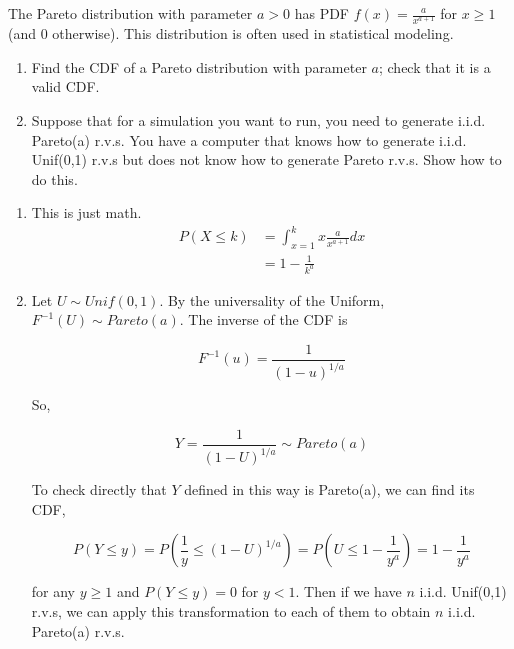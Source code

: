 \documentclass[11pt]{article}
\begin{document}
\begin{exercise}
The Pareto distribution with parameter $a > 0$ has PDF $f(x) = \frac{a}{x^{a+1}}$ for $x \ge 1$ (and 0 otherwise). This distribution is often used in statistical modeling.

\begin{enumerate}
\item Find the CDF of a Pareto distribution with parameter $a$; check that it is a valid CDF.

\item Suppose that for a simulation you want to run, you need to generate i.i.d. Pareto(a) r.v.s. You have a computer that knows how to generate i.i.d. Unif(0,1) r.v.s but does not know how to generate Pareto r.v.s. Show how to do this.
\end{enumerate}
\end{exercise}
\begin{solution}
\begin{enumerate}
\item This is just math.
\begin{align*}
P(X \leq k) &= \int_{x=1}^{k} x \frac{a}{x^{a+1}} dx \\
&= 1 - \frac{1}{k^a}
\end{align*}
\item Let $U \sim Unif(0,1)$. By the universality of the Uniform, $F^{-1}(U) \sim Pareto(a)$. The inverse of the CDF is

$$F^{-1}(u) = \frac{1}{(1-u)^{1/a}}$$

So,

$$Y = \frac{1}{(1-U)^{1/a}} \sim Pareto(a)$$

To check directly that $Y$ defined in this way is Pareto(a), we can find its CDF,

$$P(Y \le y) = P(\frac{1}{y} \le (1-U)^{1/a}) = P(U \le 1 - \frac{1}{y^a}) = 1 - \frac{1}{y^a}$$

for any $y \ge 1$ and $P(Y \le y) = 0$ for $y < 1$. Then if we have $n$ i.i.d. Unif(0,1) r.v.s, we can apply this transformation to each of them to obtain $n$ i.i.d. Pareto(a) r.v.s.

\end{enumerate}


\end{solution}
\end{document}
